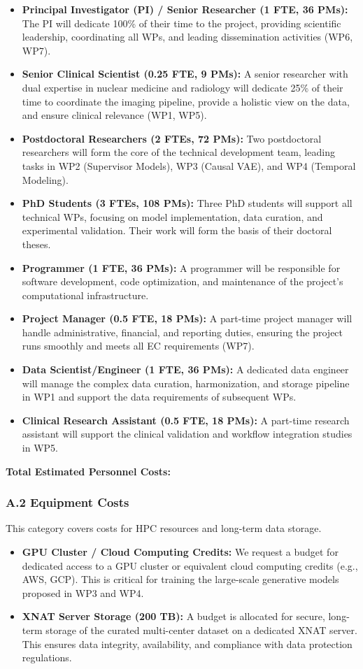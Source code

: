 \begin{itemize}
    \item \textbf{Principal Investigator (PI) / Senior Researcher (1 FTE, 36 PMs):} The PI will dedicate 100\% of their time to the project, providing scientific leadership, coordinating all WPs, and leading dissemination activities (WP6, WP7).
    \item \textbf{Senior Clinical Scientist (0.25 FTE, 9 PMs):} A senior researcher with dual expertise in nuclear medicine and radiology will dedicate 25\% of their time to coordinate the imaging pipeline, provide a holistic view on the data, and ensure clinical relevance (WP1, WP5).
    \item \textbf{Postdoctoral Researchers (2 FTEs, 72 PMs):} Two postdoctoral researchers will form the core of the technical development team, leading tasks in WP2 (Supervisor Models), WP3 (Causal VAE), and WP4 (Temporal Modeling).
    \item \textbf{PhD Students (3 FTEs, 108 PMs):} Three PhD students will support all technical WPs, focusing on model implementation, data curation, and experimental validation. Their work will form the basis of their doctoral theses.
    \item \textbf{Programmer (1 FTE, 36 PMs):} A programmer will be responsible for software development, code optimization, and maintenance of the project's computational infrastructure.
    \item \textbf{Project Manager (0.5 FTE, 18 PMs):} A part-time project manager will handle administrative, financial, and reporting duties, ensuring the project runs smoothly and meets all EC requirements (WP7).
    \item \textbf{Data Scientist/Engineer (1 FTE, 36 PMs):} A dedicated data engineer will manage the complex data curation, harmonization, and storage pipeline in WP1 and support the data requirements of subsequent WPs.
    \item \textbf{Clinical Research Assistant (0.5 FTE, 18 PMs):} A part-time research assistant will support the clinical validation and workflow integration studies in WP5.
\end{itemize}

\textbf{Total Estimated Personnel Costs: }

\subsubsection*{A.2 Equipment Costs}
This category covers costs for HPC resources and long-term data storage.
\begin{itemize}
    \item \textbf{GPU Cluster / Cloud Computing Credits:} We request a budget for dedicated access to a GPU cluster or equivalent cloud computing credits (e.g., AWS, GCP). This is critical for training the large-scale generative models proposed in WP3 and WP4.
    \item \textbf{XNAT Server Storage (200 TB):} A budget is allocated for secure, long-term storage of the curated multi-center dataset on a dedicated XNAT server. This ensures data integrity, availability, and compliance with data protection regulations.
\end{itemize}

